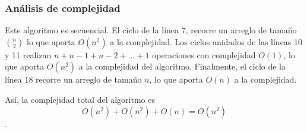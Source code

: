 \subsubsection{Análisis de complejidad}

Este algoritmo es secuencial. El ciclo de la línea 7, recorre un arreglo de tamaño
$\binom{n}{2}$ lo que aporta $O(n^2)$ a la complejidad. Los ciclos anidados de las
líneas 10 y 11 realizan $n + n-1 + n-2 + \dots + 1$ operaciones con complejidad $O(1)$,
lo que aporta $O(n^2)$  a la complejidad del algoritmo. Finalmente, el ciclo de la
línea 18 recorre un arreglo de tamaño $n$, lo que aporta $O(n)$ a la complejidad.

Así, la complejidad total del algoritmo es \[ O(n^2) + O(n^2) + O(n) = O(n^2)\].
